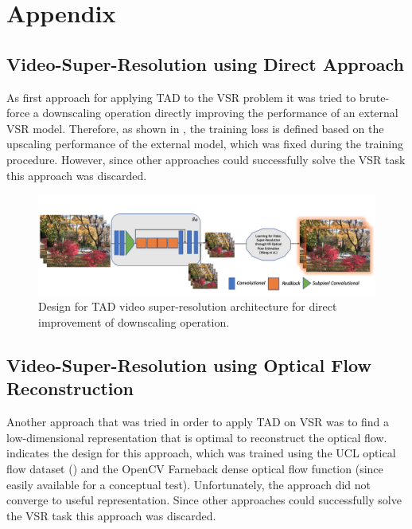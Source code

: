 \newpage
\chapter{Appendix}
\label{sec:Appendix}

\section*{Video-Super-Resolution using Direct Approach}
As first approach for applying \ac{TAD} to the \ac{VSR} problem it was tried to brute-force a downscaling operation directly improving the performance of an external \ac{VSR} model. Therefore, as shown in , the training loss is defined based on the upscaling performance of the external model, which was fixed during the training procedure. However, since other approaches could successfully solve the \ac{VSR} task this approach was discarded.

\begin{figure}[!ht]
	\centering
	\includegraphics[width=14cm]{figures/architecture_video_direct.png}
	\caption{Design for \ac{TAD} video super-resolution architecture for direct improvement of downscaling operation. }
  \label{fig:architecture_video_direct}
\end{figure}

\section*{Video-Super-Resolution using Optical Flow Reconstruction}
Another approach that was tried in order to apply \ac{TAD} on \ac{VSR} was to find a low-dimensional representation that is optimal to reconstruct the optical flow.  indicates the design for this approach, which was trained using the UCL optical flow dataset (\cite{ADAEMFOF}) and the OpenCV Farneback dense optical flow function (since easily available for a conceptual test). Unfortunately, the approach did not converge to useful representation. Since other approaches could successfully solve the \ac{VSR} task this approach was discarded.

